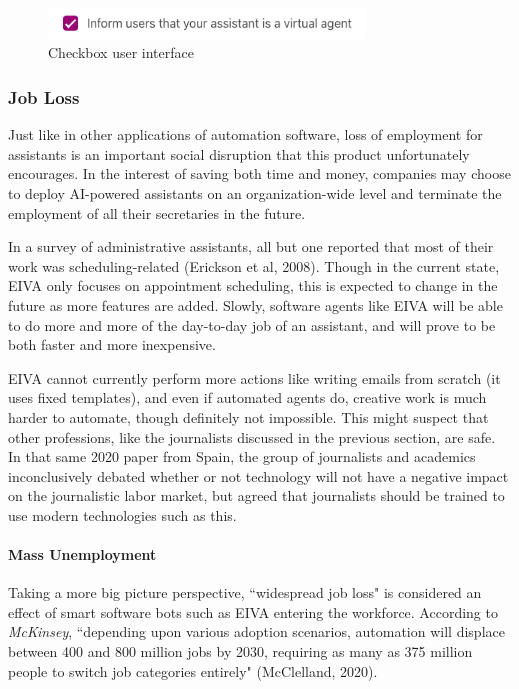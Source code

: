 \documentclass{article}
\begin{document}
\begin{figure}[h]
 \centering
 \includegraphics[width=0.75\textwidth]{checkbox.png}
 \caption{Checkbox user interface}
 \label{fig:checkbox}
\end{figure}

\subsubsection{Job Loss}

Just like in other applications of automation software, loss of employment for assistants is an important social disruption that this product unfortunately encourages. In the interest of saving both time and money, companies may choose to deploy AI-powered assistants on an organization-wide level and terminate the employment of all their secretaries in the future.

In a survey of administrative assistants, all but one reported that most of their work was scheduling-related (Erickson et al, 2008). Though in the current state, EIVA only focuses on appointment scheduling, this is expected to change in the future as more features are added. Slowly, software agents like EIVA will be able to do more and more of the day-to-day job of an assistant, and will prove to be both faster and more inexpensive.

EIVA cannot currently perform more actions like writing emails from scratch (it uses fixed templates), and even if automated agents do, creative work is much harder to automate, though definitely not impossible. This might suspect that other professions, like the journalists discussed in the previous section, are safe. In that same 2020 paper from Spain, the group of journalists and academics inconclusively debated whether or not technology will not have a negative impact on the journalistic labor market, but agreed that journalists should be trained to use modern technologies such as this.

\paragraph{Mass Unemployment}

Taking a more big picture perspective, ``widespread job loss" is considered an effect of smart software bots such as EIVA entering the workforce. According to \emph{McKinsey}, ``depending upon various adoption scenarios, automation will displace between 400 and 800 million jobs by 2030, requiring as many as 375 million people to switch job categories entirely" (McClelland, 2020).
\end{document}
